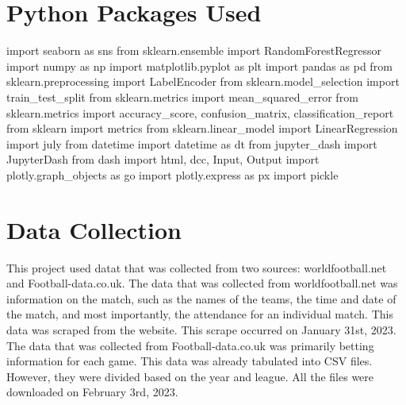\documentclass[
  letterpaper,
  DIV=11,
  numbers=noendperiod]{scrartcl}
\newenvironment{Shaded}{\begin{snugshade}}{\end{snugshade}}
\newcommand{\ImportTok}[1]{\textcolor[rgb]{0.00,0.46,0.62}{#1}}
\newcommand{\NormalTok}[1]{\textcolor[rgb]{0.00,0.23,0.31}{#1}}
\begin{document}
\hypertarget{python-packages-used}{%
\section{Python Packages Used}\label{python-packages-used}}

\begin{Shaded}
\begin{Highlighting}[]
\ImportTok{import}\NormalTok{ seaborn }\ImportTok{as}\NormalTok{ sns}
\ImportTok{from}\NormalTok{ sklearn.ensemble }\ImportTok{import}\NormalTok{ RandomForestRegressor}
\ImportTok{import}\NormalTok{ numpy }\ImportTok{as}\NormalTok{ np}
\ImportTok{import}\NormalTok{ matplotlib.pyplot }\ImportTok{as}\NormalTok{ plt}
\ImportTok{import}\NormalTok{ pandas }\ImportTok{as}\NormalTok{ pd}
\ImportTok{from}\NormalTok{ sklearn.preprocessing }\ImportTok{import}\NormalTok{ LabelEncoder}
\ImportTok{from}\NormalTok{ sklearn.model\_selection }\ImportTok{import}\NormalTok{ train\_test\_split}
\ImportTok{from}\NormalTok{ sklearn.metrics }\ImportTok{import}\NormalTok{ mean\_squared\_error}
\ImportTok{from}\NormalTok{ sklearn.metrics }\ImportTok{import}\NormalTok{ accuracy\_score, confusion\_matrix, classification\_report}
\ImportTok{from}\NormalTok{ sklearn }\ImportTok{import}\NormalTok{ metrics}
\ImportTok{from}\NormalTok{ sklearn.linear\_model }\ImportTok{import}\NormalTok{ LinearRegression}
\ImportTok{import}\NormalTok{ july}
\ImportTok{from}\NormalTok{ datetime }\ImportTok{import}\NormalTok{ datetime }\ImportTok{as}\NormalTok{ dt}
\ImportTok{from}\NormalTok{ jupyter\_dash }\ImportTok{import}\NormalTok{ JupyterDash}
\ImportTok{from}\NormalTok{ dash }\ImportTok{import}\NormalTok{ html, dcc, Input, Output}
\ImportTok{import}\NormalTok{ plotly.graph\_objects }\ImportTok{as}\NormalTok{ go}
\ImportTok{import}\NormalTok{ plotly.express }\ImportTok{as}\NormalTok{ px}
\ImportTok{import}\NormalTok{ pickle}
\end{Highlighting}
\end{Shaded}

\hypertarget{data-collection}{%
\section{Data Collection}\label{data-collection}}

This project used datat that was collected from two sources:
worldfootball.net and Football-data.co.uk. The data that was collected
from worldfootball.net was information on the match, such as the names
of the teams, the time and date of the match, and most importantly, the
attendance for an individual match. This data was scraped from the
website. This scrape occurred on January 31st, 2023. The data that was
collected from Football-data.co.uk was primarily betting information for
each game. This data was already tabulated into CSV files. However, they
were divided based on the year and league. All the files were downloaded
on February 3rd, 2023.
\end{document}
